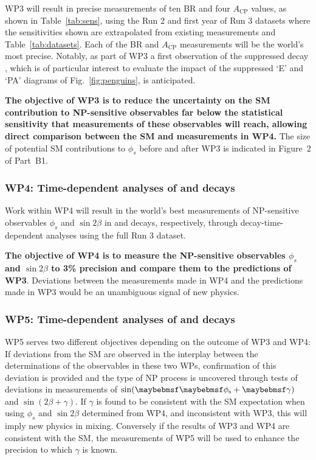 \documentclass[11pt,a4paper]{article}
\begin{document}
WP3 will result in precise measurements of ten BR and four $A_{\text{CP}}$ values, as shown in Table~\ref{tab:sens}, using the Run 2 and first year of Run 3 datasets where the sensitivities shown are extrapolated from existing measurements and Table~\ref{tab:datasets}.  Each of the BR and $A_{\text{CP}}$ measurements will be the world's most precise. Notably, as part of WP3 a first observation of the suppressed decay \HepProcess{\PBzero\to\PDsplus\PDsminus}, which is of particular interest to evaluate the impact of the suppressed `E' and `PA' diagrams of Fig.~\ref{fig:penguins}, is anticipated.

\textbf{The objective of WP3 is to reduce the uncertainty on the SM contribution to NP-sensitive observables far below the statistical sensitivity that measurements of these observables will reach, allowing direct comparison between the SM and measurements in WP4.} The size of potential SM contributions to $\phi_s$ before and after WP3 is indicated in Figure~2 of Part~B1.

\subsubsection{WP4: Time-dependent analyses of \HepProcess{\PBzero\to\PDplus\PDminus} and \HepProcess{\PBs\to\PDsplus\PDsminus} decays}
Work within WP4 will result in the world's best measurements of NP-sensitive observables $\phi_s$ and $\sin2\beta$ in \HepProcess{\PBs\to\PDsplus\PDsminus} and \HepProcess{\PBzero\to\PDplus\PDminus} decays, respectively, through decay-time-dependent analyses using the full Run 3 dataset.

\textbf{The objective of WP4 is to measure the NP-sensitive observables $\phi_s$ and $\sin2\beta$ to 3\% precision and compare them to the predictions of WP3}. Deviations between the measurements made in WP4 and the predictions made in WP3 would be an unambiguous signal of new physics.

\subsubsection{WP5: Time-dependent analyses of \HepProcess{\PBs\to\PDs\PK} and \HepProcess{\PBzero\to\PD\Ppi} decays}

WP5 serves two different objectives depending on the outcome of WP3 and WP4: If deviations from the SM are observed in the interplay between the determinations of the observables in these two WPs, confirmation of this deviation is provided and the type of NP process is uncovered through tests of deviations in measurements of $\sin(\phis+\gamma)$ and $\sin(2\beta+\gamma)$. If $\gamma$ is found to be consistent with the SM expectation when using $\phi_s$ and $\sin2\beta$ determined from WP4, and inconsistent with WP3, this will imply new physics in mixing. Conversely if the results of WP3 and WP4 are consistent with the SM, the measurements of WP5 will be used to enhance the precision to which $\gamma$ is known. 
\end{document}

